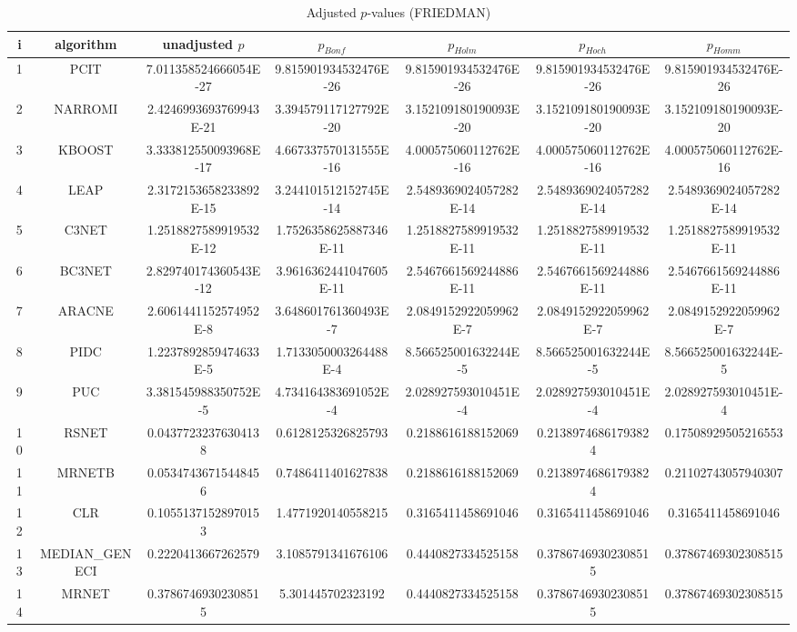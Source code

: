 \documentclass[a4paper,10pt]{article}
\begin{document}
\begin{landscape}
\begin{table}[!htp]
\centering\scriptsize
\caption{Adjusted $p$-values (FRIEDMAN)}
\begin{tabular}{ccccccc}
i&algorithm&unadjusted $p$&$p_{Bonf}$&$p_{Holm}$&$p_{Hoch}$&$p_{Homm}$\\
\hline
1&PCIT&7.011358524666054E-27&9.815901934532476E-26&9.815901934532476E-26&9.815901934532476E-26&9.815901934532476E-26\\
2&NARROMI&2.4246993693769943E-21&3.394579117127792E-20&3.152109180190093E-20&3.152109180190093E-20&3.152109180190093E-20\\
3&KBOOST&3.333812550093968E-17&4.667337570131555E-16&4.000575060112762E-16&4.000575060112762E-16&4.000575060112762E-16\\
4&LEAP&2.3172153658233892E-15&3.244101512152745E-14&2.5489369024057282E-14&2.5489369024057282E-14&2.5489369024057282E-14\\
5&C3NET&1.2518827589919532E-12&1.7526358625887346E-11&1.2518827589919532E-11&1.2518827589919532E-11&1.2518827589919532E-11\\
6&BC3NET&2.829740174360543E-12&3.9616362441047605E-11&2.5467661569244886E-11&2.5467661569244886E-11&2.5467661569244886E-11\\
7&ARACNE&2.6061441152574952E-8&3.648601761360493E-7&2.0849152922059962E-7&2.0849152922059962E-7&2.0849152922059962E-7\\
8&PIDC&1.2237892859474633E-5&1.7133050003264488E-4&8.566525001632244E-5&8.566525001632244E-5&8.566525001632244E-5\\
9&PUC&3.381545988350752E-5&4.734164383691052E-4&2.028927593010451E-4&2.028927593010451E-4&2.028927593010451E-4\\
10&RSNET&0.04377232376304138&0.6128125326825793&0.2188616188152069&0.21389746861793824&0.17508929505216553\\
11&MRNETB&0.05347436715448456&0.7486411401627838&0.2188616188152069&0.21389746861793824&0.21102743057940307\\
12&CLR&0.10551371528970153&1.4771920140558215&0.3165411458691046&0.3165411458691046&0.3165411458691046\\
13&MEDIAN_GENECI&0.2220413667262579&3.1085791341676106&0.4440827334525158&0.37867469302308515&0.37867469302308515\\
14&MRNET&0.37867469302308515&5.301445702323192&0.4440827334525158&0.37867469302308515&0.37867469302308515\\
\hline
\end{tabular}
\end{table}


\end{landscape}
\end{document}
